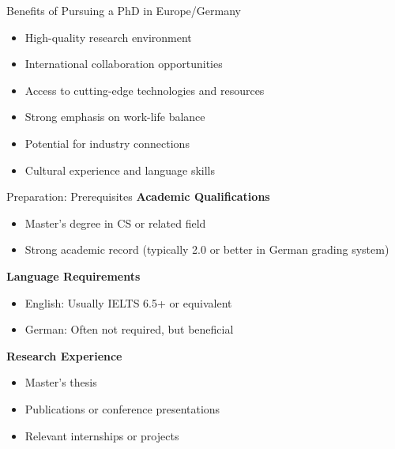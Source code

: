 \documentclass[aspectratio=169,10pt]{beamer}
\begin{document}
\begin{frame}{Benefits of Pursuing a PhD in Europe/Germany}
    \begin{itemize}
        \item High-quality research environment
        \item International collaboration opportunities
        \item Access to cutting-edge technologies and resources
        \item Strong emphasis on work-life balance
        \item Potential for industry connections
        \item Cultural experience and language skills
    \end{itemize}
\end{frame}

\begin{frame}{Preparation: Prerequisites}
    \textbf{Academic Qualifications}
    \begin{itemize}
        \item Master's degree in CS or related field
        \item Strong academic record (typically 2.0 or better in German grading system)
    \end{itemize}
    
    \textbf{Language Requirements}
    \begin{itemize}
        \item English: Usually IELTS 6.5+ or equivalent
        \item German: Often not required, but beneficial
    \end{itemize}
    
    \textbf{Research Experience}
    \begin{itemize}
        \item Master's thesis
        \item Publications or conference presentations
        \item Relevant internships or projects
    \end{itemize}
\end{frame}
\end{document}
